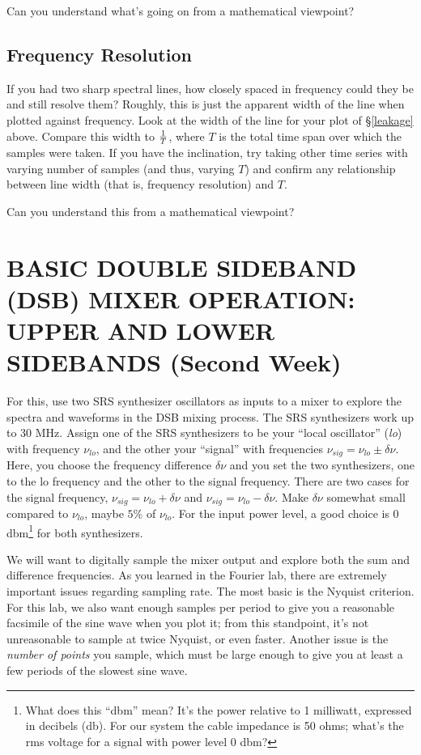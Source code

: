 \documentclass[11pt,preprint]{aastex}
\begin{document}
Can you understand what's going on from a mathematical viewpoint?

\subsection{Frequency Resolution}

If you had two sharp spectral lines, how closely spaced in frequency
could they be and still resolve them? Roughly, this is just the apparent
width of the line when plotted against frequency. Look at the width of
the line for your plot of \S \ref{leakage} above. Compare this width to
$1 \over T$, where $T$ is the total time span over which the samples
were taken. If you have the inclination, try taking other time series
with varying number of samples (and thus, varying $T$) and confirm any
relationship between line width (that is, frequency resolution) and
$T$.

Can you understand this from a mathematical viewpoint?

\section{ BASIC DOUBLE SIDEBAND (DSB) MIXER OPERATION: UPPER AND LOWER
  SIDEBANDS (Second Week)}
\label{upperlowerdsb}

        For this, use two SRS synthesizer oscillators as inputs to a
mixer to explore the spectra and waveforms in the DSB mixing process.
The SRS synthesizers work up to 30 MHz.  Assign one of the SRS
synthesizers to be your ``local oscillator'' ({\it lo}) with frequency
$\nu_{lo}$, and the other your ``signal'' with frequencies $\nu_{sig} =
\nu_{lo} \pm \delta \nu$.  Here, you choose the frequency difference
$\delta \nu$ and you set the two synthesizers, one to the lo
frequency and the other to the signal frequency. There are two cases for
the signal frequency, $\nu_{sig} = \nu_{lo} + \delta \nu$ and
$\nu_{sig} = \nu_{lo} - \delta \nu$.  Make $\delta \nu$ somewhat small
compared to $\nu_{lo}$, maybe $5\%$ of $\nu_{lo}$.  For the input power
level, a good choice is 0 dbm\footnote{What does this ``dbm'' mean? It's
the power relative to 1 milliwatt, expressed in decibels (db). For our
system the cable impedance is 50 ohms; what's the rms voltage for a
signal with power level 0 dbm?} for both synthesizers.

        We will want to digitally sample the mixer output and explore
both the sum and difference frequencies. As you learned in the Fourier
lab, there are extremely important issues regarding sampling rate. The
most basic is the Nyquist criterion. For this lab, we also want enough
samples per period to give you a reasonable facsimile of the sine wave
when you plot it; from this standpoint, it's not unreasonable to sample
at twice Nyquist, or even faster.  Another issue is the {\it number of
points} you sample, which must be large enough to give you at least a
few periods of the slowest sine wave.
\end{document}

